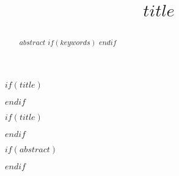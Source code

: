 \onecolumn
{}

$if(title)$
\title[$if(runningtitle)$$runningtitle$$endif$]{$title$}
$endif$

\author[\firstAuthorLast ]{\Authors}
\address{}
\correspondance{}

\extraAuth{}

$if(title)$
\maketitle
$endif$

$if(abstract)$
\begin{abstract}
\section{}
$abstract$
$if(keywords)$
\tiny
{}
$endif$
\end{abstract}
$endif$


